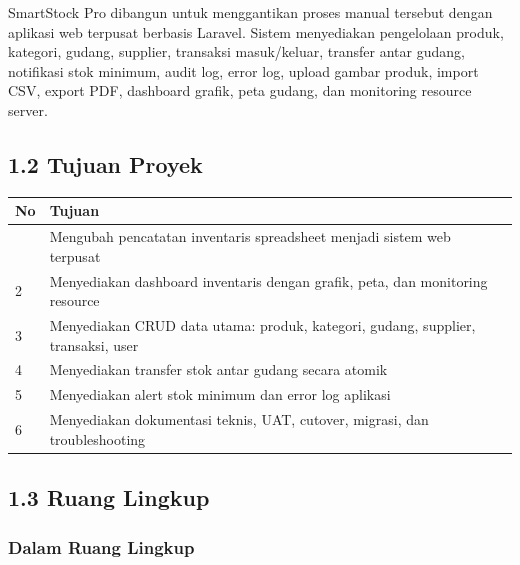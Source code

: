 \documentclass[
]{article}
\begin{document}
SmartStock Pro dibangun untuk menggantikan proses manual tersebut dengan
aplikasi web terpusat berbasis Laravel. Sistem menyediakan pengelolaan
produk, kategori, gudang, supplier, transaksi masuk/keluar, transfer
antar gudang, notifikasi stok minimum, audit log, error log, upload
gambar produk, import CSV, export PDF, dashboard grafik, peta gudang,
dan monitoring resource server.

\subsection{1.2 Tujuan Proyek}\label{12-tujuan-proyek}

\begin{longtable}[]{@{}p{}p{}@{}}
\toprule\noalign{}
No & Tujuan \\
\midrule\noalign{}
\endhead
\bottomrule\noalign{}
\endlastfoot
1 & Mengubah pencatatan inventaris spreadsheet menjadi sistem web
terpusat \\
2 & Menyediakan dashboard inventaris dengan grafik, peta, dan monitoring
resource \\
3 & Menyediakan CRUD data utama: produk, kategori, gudang, supplier,
transaksi, user \\
4 & Menyediakan transfer stok antar gudang secara atomik \\
5 & Menyediakan alert stok minimum dan error log aplikasi \\
6 & Menyediakan dokumentasi teknis, UAT, cutover, migrasi, dan
troubleshooting \\
\end{longtable}

\subsection{1.3 Ruang Lingkup}\label{13-ruang-lingkup}

\subsubsection{Dalam Ruang Lingkup}\label{dalam-ruang-lingkup}
\end{document}
